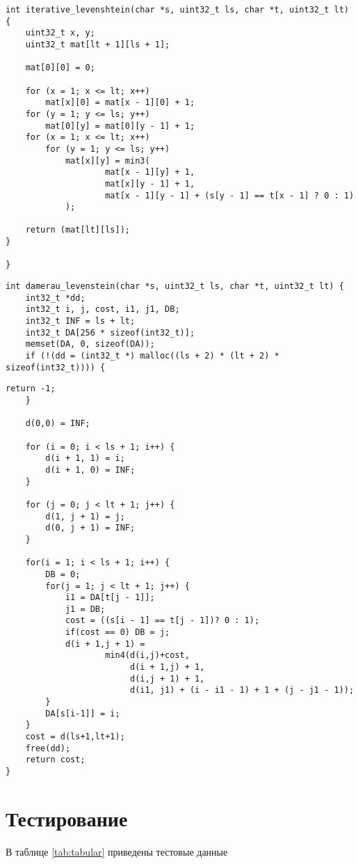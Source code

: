 \begin{lstlisting}[caption=Матрично]
int iterative_levenshtein(char *s, uint32_t ls, char *t, uint32_t lt) {
    uint32_t x, y;
    uint32_t mat[lt + 1][ls + 1];

    mat[0][0] = 0;

    for (x = 1; x <= lt; x++)
        mat[x][0] = mat[x - 1][0] + 1;
    for (y = 1; y <= ls; y++)
        mat[0][y] = mat[0][y - 1] + 1;
    for (x = 1; x <= lt; x++)
        for (y = 1; y <= ls; y++)
            mat[x][y] = min3(
                    mat[x - 1][y] + 1,
                    mat[x][y - 1] + 1,
                    mat[x - 1][y - 1] + (s[y - 1] == t[x - 1] ? 0 : 1)
            );

    return (mat[lt][ls]);
}

}

\end{lstlisting}

\begin{lstlisting}[caption=Функция нахождения расстояния Дамерау--Левенштейна]
int damerau_levenstein(char *s, uint32_t ls, char *t, uint32_t lt) {
    int32_t *dd;
    int32_t i, j, cost, i1, j1, DB;
    int32_t INF = ls + lt;
    int32_t DA[256 * sizeof(int32_t)];
    memset(DA, 0, sizeof(DA));
    if (!(dd = (int32_t *) malloc((ls + 2) * (lt + 2) * sizeof(int32_t)))) {
\end{lstlisting}
\begin{lstlisting}[caption=Функция нахождения расстояния Дамерау--Левенштейна]
        return -1;
    }

    d(0,0) = INF;

    for (i = 0; i < ls + 1; i++) {
        d(i + 1, 1) = i;
        d(i + 1, 0) = INF;
    }

    for (j = 0; j < lt + 1; j++) {
        d(1, j + 1) = j;
        d(0, j + 1) = INF;
    }

    for(i = 1; i < ls + 1; i++) {
        DB = 0;
        for(j = 1; j < lt + 1; j++) {
            i1 = DA[t[j - 1]];
            j1 = DB;
            cost = ((s[i - 1] == t[j - 1])? 0 : 1);
            if(cost == 0) DB = j;
            d(i + 1,j + 1) =
                    min4(d(i,j)+cost,
                         d(i + 1,j) + 1,
                         d(i,j + 1) + 1,
                         d(i1, j1) + (i - i1 - 1) + 1 + (j - j1 - 1));
        }
        DA[s[i-1]] = i;
    }
    cost = d(ls+1,lt+1);
    free(dd);
    return cost;
}
\end{lstlisting}

\section{Тестирование}
В таблице \ref {tab:tabular} приведены тестовые данные

